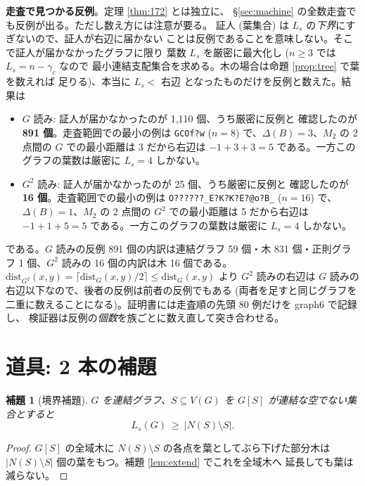 \documentclass[paper=a4,fontsize=10.5pt,jafontsize=10.5pt]{jlreq}
\theoremstyle{plain}
\newtheorem{lemma}[theorem]{補題}
\theoremstyle{definition}
\begin{document}
\medskip
\noindent\textbf{走査で見つかる反例}。定理 \ref{thm:172} とは独立に、
\S\ref{sec:machine} の全数走査でも反例が出る。ただし数え方には注意が要る。
証人 (葉集合) は $L_s$ の\emph{下界}にすぎないので、証人が右辺に届かない
ことは反例であることを意味しない。そこで証人が届かなかったグラフに限り
葉数 $L_s$ を厳密に最大化し ($n \ge 3$ では $L_s = n - \gamma_c$ なので
最小連結支配集合を求める。木の場合は命題 \ref{prop:tree} で葉を数えれば
足りる)、本当に $L_s < {}$ 右辺 となったものだけを反例と数えた。結果は

\begin{itemize}
\item $G$ 読み: 証人が届かなかったのが 1,110 個、うち厳密に反例と
  確認したのが \textbf{891 個}。走査範囲での最小の例は \texttt{GCOf?w} ($n = 8$) で、$\Delta(B) = 3$、$M_2$ の 2 点間の $G$ での最小距離は 3 だから右辺は $-1 + 3 + 3 = 5$ である。一方このグラフの葉数は厳密に $L_s = 4$ しかない。
\item $G^2$ 読み: 証人が届かなかったのが 25 個、うち厳密に反例と
  確認したのが \textbf{16 個}。走査範囲での最小の例は \texttt{O??????\_E?K?K?E?@o?B\_} ($n = 16$) で、$\Delta(B) = 1$、$M_2$ の 2 点間の $G^2$ での最小距離は 5 だから右辺は $-1 + 1 + 5 = 5$ である。一方このグラフの葉数は厳密に $L_s = 4$ しかない。
\end{itemize}

\noindent
である。$G$ 読みの反例 891 個の内訳は連結グラフ 59 個・木 831 個・正則グラフ 1 個、$G^2$ 読みの 16 個の内訳は木 16 個である。$\mathrm{dist}_{G^2}(x,y) = \lceil \mathrm{dist}_G(x,y)/2 \rceil \le \mathrm{dist}_G(x,y)$ より $G^2$ 読みの右辺は $G$ 読みの右辺以下なので、後者の反例は前者の反例でもある (両者を足すと同じグラフを二重に数えることになる)。証明書には走査順の先頭 80 例だけを graph6 で記録し、
検証器は反例の\emph{個数}を族ごとに数え直して突き合わせる。

\section{道具: 2 本の補題}\label{sec:lemmas}

\begin{lemma}[境界補題]\label{lem:boundary}
$G$ を連結グラフ、$S \subseteq V(G)$ を $G[S]$ が連結な空でない集合とすると
\[ L_s(G) \ \ge \ |N(S) \setminus S| . \]
\end{lemma}

\begin{proof}
$G[S]$ の全域木に $N(S) \setminus S$ の各点を葉としてぶら下げた部分木は
$|N(S) \setminus S|$ 個の葉をもつ。補題 \ref{lem:extend} でこれを全域木へ
延長しても葉は減らない。
\end{proof}
\end{document}
